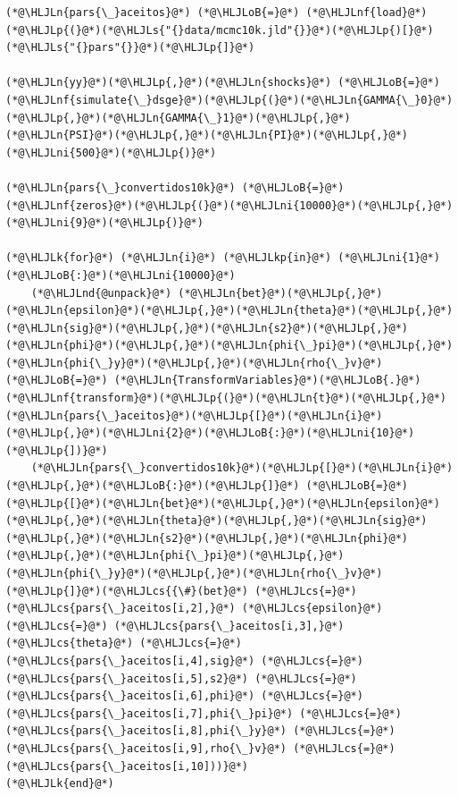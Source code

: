 \documentclass[12pt,a4paper]{article}
\newcommand{\HLJLk}[1]{\textcolor[RGB]{148,91,176}{\textbf{#1}}}
\newcommand{\HLJLkp}[1]{\textcolor[RGB]{148,91,176}{\textbf{#1}}}
\newcommand{\HLJLn}[1]{#1}
\newcommand{\HLJLnd}[1]{\textcolor[RGB]{214,102,97}{#1}}
\newcommand{\HLJLnf}[1]{\textcolor[RGB]{66,102,213}{#1}}
\newcommand{\HLJLs}[1]{\textcolor[RGB]{201,61,57}{#1}}
\newcommand{\HLJLni}[1]{\textcolor[RGB]{59,151,46}{#1}}
\newcommand{\HLJLoB}[1]{\textcolor[RGB]{102,102,102}{\textbf{#1}}}
\newcommand{\HLJLp}[1]{#1}
\newcommand{\HLJLcs}[1]{\textcolor[RGB]{153,153,119}{\textit{#1}}}
\begin{document}
\begin{lstlisting}
(*@\HLJLn{pars{\_}aceitos}@*) (*@\HLJLoB{=}@*) (*@\HLJLnf{load}@*)(*@\HLJLp{(}@*)(*@\HLJLs{"{}data/mcmc10k.jld"{}}@*)(*@\HLJLp{)[}@*)(*@\HLJLs{"{}pars"{}}@*)(*@\HLJLp{]}@*)

(*@\HLJLn{yy}@*)(*@\HLJLp{,}@*)(*@\HLJLn{shocks}@*) (*@\HLJLoB{=}@*) (*@\HLJLnf{simulate{\_}dsge}@*)(*@\HLJLp{(}@*)(*@\HLJLn{GAMMA{\_}0}@*)(*@\HLJLp{,}@*)(*@\HLJLn{GAMMA{\_}1}@*)(*@\HLJLp{,}@*)(*@\HLJLn{PSI}@*)(*@\HLJLp{,}@*)(*@\HLJLn{PI}@*)(*@\HLJLp{,}@*)(*@\HLJLni{500}@*)(*@\HLJLp{)}@*)

(*@\HLJLn{pars{\_}convertidos10k}@*) (*@\HLJLoB{=}@*) (*@\HLJLnf{zeros}@*)(*@\HLJLp{(}@*)(*@\HLJLni{10000}@*)(*@\HLJLp{,}@*)(*@\HLJLni{9}@*)(*@\HLJLp{)}@*)

(*@\HLJLk{for}@*) (*@\HLJLn{i}@*) (*@\HLJLkp{in}@*) (*@\HLJLni{1}@*)(*@\HLJLoB{:}@*)(*@\HLJLni{10000}@*)
    (*@\HLJLnd{@unpack}@*) (*@\HLJLn{bet}@*)(*@\HLJLp{,}@*)(*@\HLJLn{epsilon}@*)(*@\HLJLp{,}@*)(*@\HLJLn{theta}@*)(*@\HLJLp{,}@*)(*@\HLJLn{sig}@*)(*@\HLJLp{,}@*)(*@\HLJLn{s2}@*)(*@\HLJLp{,}@*)(*@\HLJLn{phi}@*)(*@\HLJLp{,}@*)(*@\HLJLn{phi{\_}pi}@*)(*@\HLJLp{,}@*)(*@\HLJLn{phi{\_}y}@*)(*@\HLJLp{,}@*)(*@\HLJLn{rho{\_}v}@*) (*@\HLJLoB{=}@*) (*@\HLJLn{TransformVariables}@*)(*@\HLJLoB{.}@*)(*@\HLJLnf{transform}@*)(*@\HLJLp{(}@*)(*@\HLJLn{t}@*)(*@\HLJLp{,}@*)(*@\HLJLn{pars{\_}aceitos}@*)(*@\HLJLp{[}@*)(*@\HLJLn{i}@*)(*@\HLJLp{,}@*)(*@\HLJLni{2}@*)(*@\HLJLoB{:}@*)(*@\HLJLni{10}@*)(*@\HLJLp{])}@*)
    (*@\HLJLn{pars{\_}convertidos10k}@*)(*@\HLJLp{[}@*)(*@\HLJLn{i}@*)(*@\HLJLp{,}@*)(*@\HLJLoB{:}@*)(*@\HLJLp{]}@*) (*@\HLJLoB{=}@*) (*@\HLJLp{[}@*)(*@\HLJLn{bet}@*)(*@\HLJLp{,}@*)(*@\HLJLn{epsilon}@*)(*@\HLJLp{,}@*)(*@\HLJLn{theta}@*)(*@\HLJLp{,}@*)(*@\HLJLn{sig}@*)(*@\HLJLp{,}@*)(*@\HLJLn{s2}@*)(*@\HLJLp{,}@*)(*@\HLJLn{phi}@*)(*@\HLJLp{,}@*)(*@\HLJLn{phi{\_}pi}@*)(*@\HLJLp{,}@*)(*@\HLJLn{phi{\_}y}@*)(*@\HLJLp{,}@*)(*@\HLJLn{rho{\_}v}@*)(*@\HLJLp{]}@*)(*@\HLJLcs{{\#}(bet}@*) (*@\HLJLcs{=}@*) (*@\HLJLcs{pars{\_}aceitos[i,2],}@*) (*@\HLJLcs{epsilon}@*) (*@\HLJLcs{=}@*) (*@\HLJLcs{pars{\_}aceitos[i,3],}@*) (*@\HLJLcs{theta}@*) (*@\HLJLcs{=}@*) (*@\HLJLcs{pars{\_}aceitos[i,4],sig}@*) (*@\HLJLcs{=}@*) (*@\HLJLcs{pars{\_}aceitos[i,5],s2}@*) (*@\HLJLcs{=}@*) (*@\HLJLcs{pars{\_}aceitos[i,6],phi}@*) (*@\HLJLcs{=}@*) (*@\HLJLcs{pars{\_}aceitos[i,7],phi{\_}pi}@*) (*@\HLJLcs{=}@*) (*@\HLJLcs{pars{\_}aceitos[i,8],phi{\_}y}@*) (*@\HLJLcs{=}@*) (*@\HLJLcs{pars{\_}aceitos[i,9],rho{\_}v}@*) (*@\HLJLcs{=}@*) (*@\HLJLcs{pars{\_}aceitos[i,10]))}@*)
(*@\HLJLk{end}@*)


\end{lstlisting}
\end{document}
